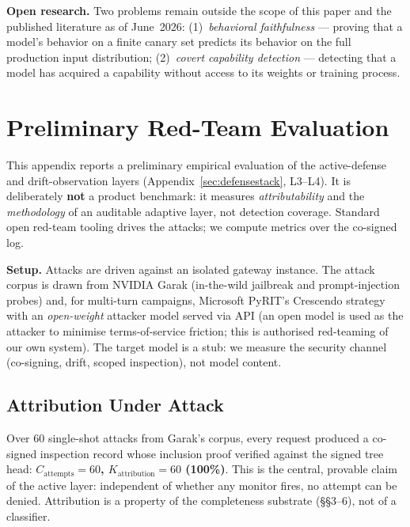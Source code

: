 \documentclass[11pt,a4paper]{article}
\newcommand{\term}[1]{\emph{#1}}
\begin{document}
\textbf{Open research.} Two problems remain outside the scope of this paper and the
published literature as of June~2026: (1)~\term{behavioral faithfulness} --- proving
that a model's behavior on a finite canary set predicts its behavior on the full
production input distribution; (2)~\term{covert capability detection} --- detecting that
a model has acquired a capability without access to its weights or training process.

\section{Preliminary Red-Team Evaluation}
\label{sec:redteam}

This appendix reports a preliminary empirical evaluation of the active-defense and
drift-observation layers (Appendix~\ref{sec:defensestack}, L3--L4). It is deliberately
\textbf{not} a product benchmark: it measures \emph{attributability} and the
\emph{methodology} of an auditable adaptive layer, not detection coverage. Standard
open red-team tooling drives the attacks; we compute metrics over the co-signed log.

\textbf{Setup.} Attacks are driven against an isolated gateway instance. The attack
corpus is drawn from NVIDIA Garak (in-the-wild jailbreak and prompt-injection probes)
and, for multi-turn campaigns, Microsoft PyRIT's Crescendo strategy with an
\emph{open-weight} attacker model served via API (an open model is used as the attacker
to minimise terms-of-service friction; this is authorised red-teaming of our own
system). The target model is a stub: we measure the security channel
(co-signing, drift, scoped inspection), not model content.

\subsection{Attribution Under Attack}

Over 60 single-shot attacks from Garak's corpus, every request produced a co-signed
inspection record whose inclusion proof verified against the signed tree head:
\textbf{$C_{\text{attempts}}=60$, $K_{\text{attribution}}=60$ (100\%)}. This is the
central, provable claim of the active layer: independent of whether any monitor fires,
no attempt can be denied. Attribution is a property of the completeness substrate
(§§3--6), not of a classifier.
\end{document}
